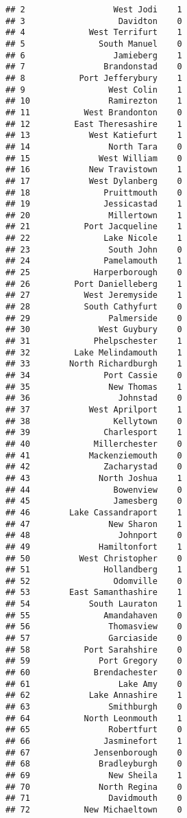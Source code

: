 \documentclass[
]{article}
\begin{document}
\begin{verbatim}
## 2                  West Jodi    1
## 3                   Davidton    0
## 4             West Terrifurt    1
## 5               South Manuel    0
## 6                  Jamieberg    1
## 7                Brandonstad    0
## 8           Port Jefferybury    1
## 9                 West Colin    1
## 10                Ramirezton    1
## 11           West Brandonton    0
## 12         East Theresashire    1
## 13            West Katiefurt    1
## 14                North Tara    0
## 15              West William    0
## 16            New Travistown    1
## 17            West Dylanberg    0
## 18               Pruittmouth    0
## 19               Jessicastad    1
## 20                Millertown    1
## 21           Port Jacqueline    1
## 22               Lake Nicole    1
## 23                South John    0
## 24               Pamelamouth    1
## 25             Harperborough    0
## 26         Port Danielleberg    1
## 27           West Jeremyside    1
## 28           South Cathyfurt    0
## 29                Palmerside    0
## 30              West Guybury    0
## 31             Phelpschester    1
## 32         Lake Melindamouth    1
## 33        North Richardburgh    1
## 34               Port Cassie    0
## 35                New Thomas    1
## 36                  Johnstad    0
## 37            West Aprilport    1
## 38                 Kellytown    0
## 39               Charlesport    1
## 40             Millerchester    0
## 41            Mackenziemouth    0
## 42               Zacharystad    0
## 43              North Joshua    1
## 44                 Bowenview    0
## 45                 Jamesberg    0
## 46        Lake Cassandraport    1
## 47                New Sharon    1
## 48                  Johnport    0
## 49              Hamiltonfort    1
## 50          West Christopher    0
## 51               Hollandberg    1
## 52                 Odomville    0
## 53        East Samanthashire    1
## 54            South Lauraton    1
## 55               Amandahaven    0
## 56                Thomasview    0
## 57                Garciaside    0
## 58           Port Sarahshire    0
## 59              Port Gregory    0
## 60             Brendachester    0
## 61                  Lake Amy    0
## 62            Lake Annashire    1
## 63                Smithburgh    0
## 64           North Leonmouth    1
## 65                Robertfurt    0
## 66               Jasminefort    1
## 67             Jensenborough    0
## 68              Bradleyburgh    0
## 69                New Sheila    1
## 70              North Regina    0
## 71                Davidmouth    0
## 72           New Michaeltown    0

\end{verbatim}
\end{document}
